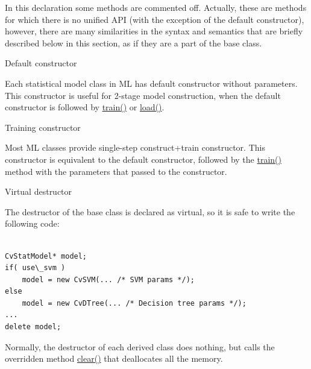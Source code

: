 In this declaration some methods are commented off. Actually, these are methods for which there is no unified API (with the exception of the default constructor), however, there are many similarities in the syntax and semantics that are briefly described below in this section, as if they are a part of the base class.



Default constructor


Each statistical model class in ML has default constructor without parameters. This constructor is useful for 2-stage model construction, when the default constructor is followed by \href{#CvStatModel.3A.3Atrain}{train()} or \href{#CvStatModel.3A.3Aload}{load()}.



Training constructor


Most ML classes provide single-step construct+train constructor. This constructor is equivalent to the default constructor, followed by the \href{#CvStatModel.3A.3Atrain}{train()} method with the parameters that passed to the constructor.



Virtual destructor


The destructor of the base class is declared as virtual, so it is safe to write the following code:

\begin{lstlisting}

CvStatModel* model;
if( use\_svm )
    model = new CvSVM(... /* SVM params */);
else
    model = new CvDTree(... /* Decision tree params */);
...
delete model;

\end{lstlisting}

Normally, the destructor of each derived class does nothing, but calls the overridden method \href{#CvStatModel.3A.3Aclear}{clear()} that deallocates all the memory.


